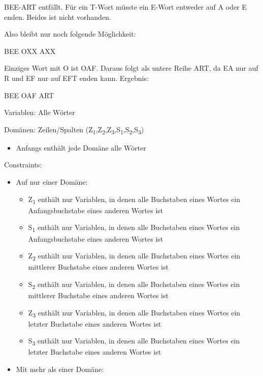 \documentclass[ngerman]{fbi-aufgabenblatt}
\begin{document}
BEE-ART entfällt. Für ein T-Wort müsste ein E-Wort entweder auf A oder E enden. Beides ist nicht vorhanden.

\newpage

Also bleibt nur noch folgende Möglichkeit:

BEE \newline
OXX \newline
AXX

Einziges Wort mit O ist OAF. Daraus folgt als untere Reihe ART, da EA nur auf R und EF nur auf EFT enden kann. Ergebnis:

BEE \newline
OAF \newline
ART


Variablen: Alle Wörter

Domänen: Zeilen/Spalten (Z\textsubscript{1},Z\textsubscript{2},Z\textsubscript{3},S\textsubscript{1},S\textsubscript{2},S\textsubscript{3})
\begin{itemize}
	\item Anfangs enthält jede Domäne alle Wörter
\end{itemize}
	
Constraints: 
\begin{itemize}
	\item Auf nur einer Domäne: 
	\begin{itemize}
	\item Z\textsubscript{1} enthält nur Variablen, in denen alle Buchstaben eines Wortes ein Anfangsbuchstabe eines anderen Wortes ist 
	\item S\textsubscript{1} enthält nur Variablen, in denen alle Buchstaben eines  Wortes ein Anfangsbuchstabe eines anderen Wortes ist  
	\item Z\textsubscript{2} enthält nur Variablen, in denen alle Buchstaben eines Wortes ein mittlerer Buchstabe eines anderen Wortes ist 
	\item S\textsubscript{2} enthält nur Variablen, in denen alle Buchstaben eines Wortes ein mittlerer Buchstabe eines anderen Wortes ist
	\item Z\textsubscript{3} enthält nur Variablen, in denen alle Buchstaben eines Wortes ein letzter Buchstabe eines anderen Wortes ist 
	\item S\textsubscript{3} enthält nur Variablen, in denen alle Buchstaben eines Wortes ein letzter Buchstabe eines anderen Wortes ist 
	\end{itemize}
	\item Mit mehr als einer Domäne: 
\end{itemize}
\end{document}
